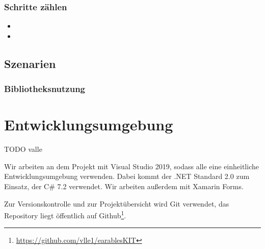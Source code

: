 \documentclass[a4paper,12pt]{article}
\begin{document}
  \subsubsection{Schritte zählen}
  \begin{itemize}
    \item[]
    \item[] 
  \end{itemize}
  \subsection{Szenarien}
    \subsubsection{Bibliotheksnutzung}


\section{Entwicklungsumgebung}
TODO valle

Wir arbeiten an dem Projekt mit Visual Studio 2019, sodass alle eine einheitliche Entwicklungsumgebung verwenden.
Dabei kommt der .NET Standard 2.0 zum Einsatz, der C\# 7.2 verwendet. Wir arbeiten außerdem mit Xamarin Forms.

Zur Versionskontrolle und zur Projektübersicht wird Git verwendet, das Repository liegt öffentlich auf Github\footnote{\url{https://github.com/vlle1/earablesKIT}}.
\clearpage
\printglossaries
{}
\end{document}
